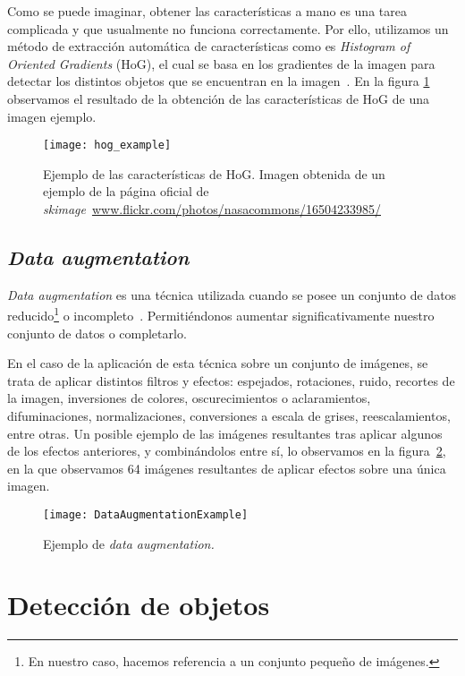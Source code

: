 Como se puede imaginar, obtener las características a mano es una tarea complicada y que usualmente no funciona correctamente. Por ello, utilizamos un método de extracción automática de características como es \textit{Histogram of Oriented Gradients} (HoG), el cual se basa en los gradientes de la imagen para detectar los distintos objetos que se encuentran en la imagen~\cite{wiki:hog}. En la figura \ref{fig:3.4.2} observamos el resultado de la obtención de las características de HoG de una imagen ejemplo.

\begin{figure}
\centering
\texttt{[image: hog\_example]}
\caption[Ejemplo de las características de HoG]{Ejemplo de las características de HoG. Imagen obtenida de un ejemplo de la página oficial de \textit{skimage}~\url{www.flickr.com/photos/nasacommons/16504233985/}}
\label{fig:3.4.2}
\end{figure}

\subsection{\textit{Data augmentation}}

\textit{Data augmentation} es una técnica utilizada cuando se posee un conjunto de datos reducido\footnote{En nuestro caso, hacemos referencia a un conjunto pequeño de imágenes.} o incompleto~\cite{emalgorithm}. Permitiéndonos aumentar significativamente nuestro conjunto de datos o completarlo. 

En el caso de la aplicación de esta técnica sobre un conjunto de imágenes, se trata de aplicar distintos filtros y efectos: espejados, rotaciones, ruido, recortes de la imagen, inversiones de colores, oscurecimientos o aclaramientos, difuminaciones, normalizaciones, conversiones a escala de grises, reescalamientos, entre otras. Un posible ejemplo de las imágenes resultantes tras aplicar algunos de los efectos anteriores, y combinándolos entre sí, lo observamos en la figura~\ref{fig:3.4.1}, en la que observamos 64 imágenes resultantes de aplicar efectos sobre una única imagen.

\begin{figure}
\centering
\texttt{[image: DataAugmentationExample]}
\caption{Ejemplo de \textit{data augmentation.}}
\label{fig:3.4.1}
\end{figure}

\section{Detección de objetos}

